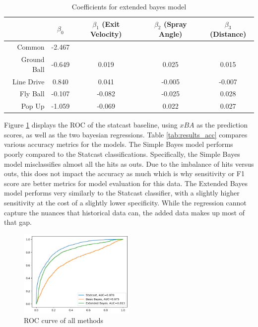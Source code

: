\documentclass[12pt,letterpaper]{article}
\begin{document}
\begin{table}[!htp]
    \centering
    \begin{tabular}{|r|c|c|c|c|}
        \hline
        & $\beta_0$ & $\beta_1$ (Exit Velocity) & $\beta_2$ (Spray Angle) & $\beta_3$ (Distance)\\ \hline
        Common      & -2.467 & & &\\ \hline
        Ground Ball & -0.649 & 0.019  & 0.025  & 0.015\\ \hline
        Line Drive  & 0.840  & 0.041  & -0.005 & -0.007\\ \hline
        Fly Ball    & -0.107 & -0.082 & -0.025 & 0.028\\ \hline
        Pop Up      & -1.059 & -0.069 & 0.022  & 0.027\\ \hline
    \end{tabular}
    \caption{Coefficients for extended bayes model}
    \label{tab:ext_coef}
\end{table}

Figure \ref{fig:results_roc} displays the ROC of the statcast baseline, using $xBA$ as the prediction scores, as well as the two bayesian regressions. Table \ref{tab:results_acc} compares various accuracy metrics for the models. The Simple Bayes model performs poorly compared to the Statcast classifications. Specifically, the Simple Bayes model misclassifies almost all the hits as outs. Due to the imbalance of hits versus outs, this does not impact the accuracy as much which is why sensitivity or F1 score are better metrics for model evaluation for this data. The Extended Bayes model performs very similarly to the Statcast classifier, with a slightly higher sensitivity at the cost of a slightly lower specificity. While the regression cannot capture the nuances that historical data can, the added data makes up most of that gap. 

\begin{figure}[!htb]
    \centering
    \includegraphics[width=0.5\textwidth]{all_roc}
    \caption{ROC curve of all methods}
    \label{fig:results_roc}
\end{figure}
\end{document}
